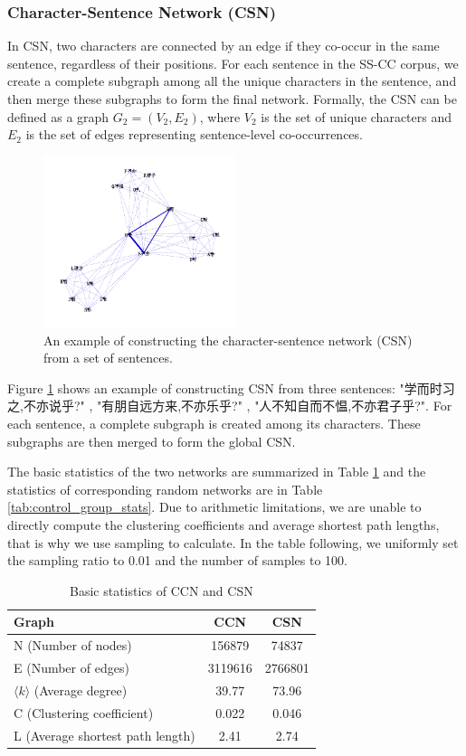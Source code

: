 \documentclass[11pt]{article}
\begin{document}
\subsubsection{Character-Sentence Network (CSN)}
In CSN, two characters are connected by an edge if they co-occur in the same sentence, regardless of their positions. For each sentence in the SS-CC corpus, we create a complete subgraph among all the unique characters in the sentence, and then merge these subgraphs to form the final network. Formally, the CSN can be defined as a graph $G_2=(V_2,E_2)$, where $V_2$ is the set of unique characters and $E_2$ is the set of edges representing sentence-level co-occurrences.
\begin{figure}[htbp]
    \centering
    \includegraphics[width=0.5\textwidth]{../example/csn_example.png}
    \caption{An example of constructing the character-sentence network (CSN) from a set of sentences.}
    \label{fig:csn_example}
    \end{figure}
Figure \ref{fig:csn_example} shows an example of constructing CSN from three sentences: "学而时习之,不亦说乎?" , "有朋自远方来,不亦乐乎?" , "人不知自而不愠,不亦君子乎?". For each sentence, a complete subgraph is created among its characters. These subgraphs are then merged to form the global CSN.

The basic statistics of the two networks are summarized in Table \ref{tab:network_stats} and the statistics of corresponding random networks are in Table \ref{tab:control_group_stats}. Due to arithmetic limitations, we are unable to directly compute the clustering coefficients and average shortest path lengths, that is why we use sampling to calculate. In the table following, we uniformly set the sampling ratio to 0.01 and the number of samples to 100. 
\begin{table}[htbp]
    \centering
    \caption{Basic statistics of CCN and CSN}
    \label{tab:network_stats}
    \begin{tabular}{|p{6cm}|c|c|}
        \hline
        \toprule
        Graph & {CCN} & {CSN} \\
        \midrule
        N (Number of nodes) & 156879 & 74837 \\
        E (Number of edges) & 3119616 & 2766801 \\
        $\langle k \rangle$ (Average degree) & 39.77 & 73.96 \\
        C (Clustering coefficient) & 0.022 & 0.046 \\
        L (Average shortest path length) & 2.41 & 2.74 \\
        \bottomrule
    \end{tabular}
\end{table}
\end{document}
